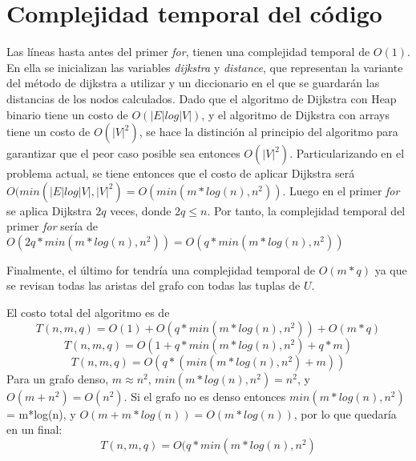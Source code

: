 \documentclass[10pt]{article}
\begin{document}
\section{Complejidad temporal del código}

Las líneas hasta antes del primer \textit{for}, tienen una complejidad temporal de $O(1)$. En ella se inicializan las variables \textit{dijkstra} y \textit{distance}, que representan la variante del método de dijkstra a utilizar y un diccionario en el que se guardarán las distancias de los nodos calculados. Dado que el algoritmo de Dijkstra con Heap binario tiene un costo de $O(|E|log|V|)$, y el algoritmo de Dijkstra con arrays tiene un costo de $O(|V|^2)$, se hace la distinción al principio del algoritmo para garantizar que el peor caso posible sea entonces $O(|V|^2)$. Particularizando en el problema actual, se tiene entonces que el costo de aplicar Dijkstra será $O(min(|E|log|V|,|V|^2) = O(min(m*log(n),n^2))$. Luego en el primer \textit{for} se aplica Dijkstra $2q$ veces, donde $2q \leq n$. Por tanto, la complejidad temporal del primer \textit{for} sería de $O(2q*min(m*log(n),n^2))= O(q*min(m*log(n),n^2))$

Finalmente, el último for tendría una complejidad temporal de $O(m*q)$ ya que se revisan todas las aristas del grafo con todas las tuplas de $U$.

El costo total del algoritmo es de 
$$T(n,m,q) = O(1)+O(q*min(m*log(n),n^2))+O(m*q)$$
$$T(n,m,q) = O(1+q*min(m*log(n),n^2)+q*m)$$
$$T(n,m,q) = O(q*(min(m*log(n),n^2)+m))$$
Para un grafo denso, $m \approx n^2$, $min(m*log(n), n^2) = n^2$, y $O(m +n^2) = O(n^2)$. Si el grafo no es denso entonces $min(m*log(n), n^2)$ = m*log(n), y $O(m + m*log(n)) = O(m*log(n))$, por lo que quedaría en un final:
$$T(n,m,q)=O(q*min(m*log(n),n^2)$$
\end{document}
